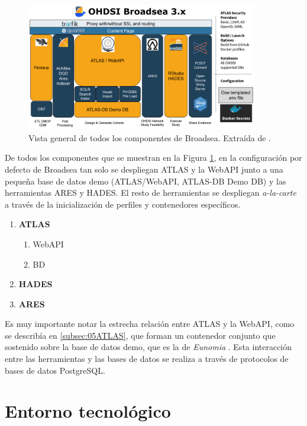 \begin{figure}[H]
    \centering
    \includegraphics[width=0.90\textwidth]{figures/OHDSIBroadsea3.0.png}
    \caption{Vista general de todos los componentes de Broadsea. Extraída de \cite{Broadsea3PPTX}.}
    \label{fig:OHDSIBroadsea3.0}
\end{figure}

De todos los componentes que se muestran en la Figura \ref{fig:OHDSIBroadsea3.0}, en la configuración por defecto de Broadsea tan solo se despliegan ATLAS y la WebAPI junto a una pequeña base de datos demo (ATLAS/WebAPI, ATLAS-DB Demo DB) y las herramientas ARES y HADES. El resto de herramientas se despliegan \textit{a-la-carte} a través de la inicialización de perfiles y contenedores específicos.

\begin{enumerate}
    \item \textbf{ATLAS}
    \begin{enumerate}
        \item WebAPI
        \item BD
    \end{enumerate}
    \item \textbf{HADES}
    \item \textbf{ARES}
\end{enumerate}

Es muy importante notar la estrecha relación entre ATLAS y la WebAPI, como se describía en \ref{subsec:05ATLAS}, que forman un contenedor conjunto que sostenido sobre la base de datos demo, que es la de \textit{Eunomia} \cite{githubPagesEunomia}. Esta interacción entre las herramientas y las bases de datos se realiza a través de protocolos de bases de datos PostgreSQL.


\section{Entorno tecnológico} \label{sec:07entorno}

